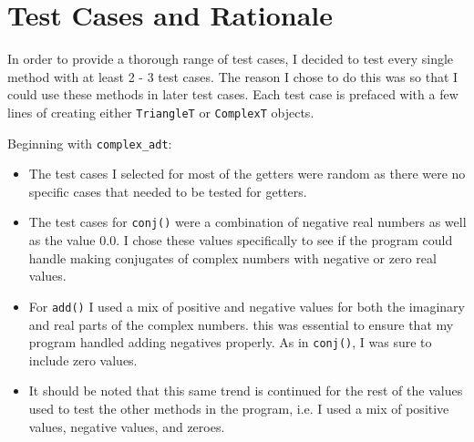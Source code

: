 \documentclass[12pt]{article}
\begin{document}
\section{Test Cases and Rationale} \label{Testing}
In order to provide a thorough range of test cases, I decided to test every single method
with at least 2 - 3 test cases. The reason I chose to do this was so that I could use these
methods in later test cases. Each test case is prefaced with a few lines of creating either
\verb|TriangleT| or \verb|ComplexT| objects. \newline

Beginning with \verb|complex_adt|:
\begin{itemize}
	\item The test cases I selected for most of the getters were random as there were no
	specific cases that needed to be tested for getters. 
	\item The test cases for \verb|conj()| were a combination of negative real numbers
	as well as the value 0.0. I chose these values specifically to see if the program could
	handle making conjugates of complex numbers with negative or zero real values. 
	\item For \verb|add()| I used a mix of positive and negative values for both the imaginary
	and real parts of the complex numbers. this was essential to ensure that my program handled
	adding negatives properly. As in \verb|conj()|, I was sure to include zero values. 
	\item It should be noted that this same trend is continued for the rest of the values 
	used to test the other methods in the program, i.e. I used a mix of positive values, negative values, and zeroes.
\end{itemize}
\end{document}

